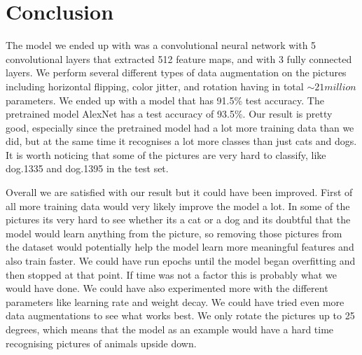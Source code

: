 \section{Conclusion}
The model we ended up with was a convolutional neural network with 5 convolutional layers that extracted 512 feature maps, and with 3 fully connected layers. We perform several different types of data augmentation on the pictures including horizontal flipping, color jitter, and rotation having in total $\sim 21 million$ parameters. We ended up with a model that has 91.5\% test accuracy. The pretrained model AlexNet has a test accuracy of 93.5\%. Our result is pretty good, especially since the pretrained model had a lot more training data than we did, but at the same time it recognises a lot more classes than just cats and dogs. It is worth noticing that some of the pictures are very hard to classify, like dog.1335 and dog.1395 in the test set.

Overall we are satisfied with our result but it could have been improved. First of all more training data would very likely improve the model a lot. In some of the pictures its very hard to see whether its a cat or a dog and its doubtful that the model would learn anything from the picture, so removing those pictures from the dataset would potentially help the model learn more meaningful features and also train faster. We could have run epochs until the model began overfitting and then stopped at that point. If time was not a factor this is probably what we would have done. We could have also experimented more with the different parameters like learning rate and weight decay. We could have tried even more data augmentations to see what works best. We only rotate the pictures up to 25 degrees, which means that the model as an example would have a hard time recognising pictures of animals upside down.


